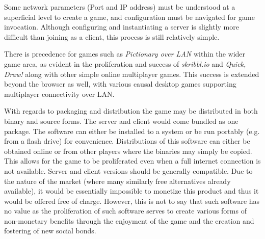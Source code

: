 \documentclass[12pt,letterpaper]{article}
\begin{document}
Some network parameters (Port and IP address) must be understood at a superficial level to create a game, and configuration must be navigated for game invocation. Although configuring and instantiating a server is slightly more difficult than joining as a client, this process is still relatively simple. 

There is precedence for games such as \textit{Pictionary over LAN} within the wider game area, as evident in the proliferation and success of \textit{skribbl.io} and \textit{Quick, Draw!} along with other simple online multiplayer games. This success is extended beyond the browser as well, with various causal desktop games supporting multiplayer connectivity over LAN.

With regards to packaging and distribution the game may be distributed in both binary and source forms. The server and client would come bundled as one package. The software can either be installed to a system or be run portably (e.g. from a flash drive) for convenience. Distributions of this software can either be obtained online or from other players where the binaries may simply be copied. This allows for the game to be proliferated even when a full internet connection is not available. Server and client versions should be generally compatible. Due to the nature of the market (where many similarly free alternatives already available), it would be essentially impossible to monetize this product and thus it would be offered free of charge.  However, this is not to say that such software has no value as the proliferation of such software serves to create various forms of non-monetary benefits through the enjoyment of the game and the creation and fostering of new social bonds.
\end{document}
